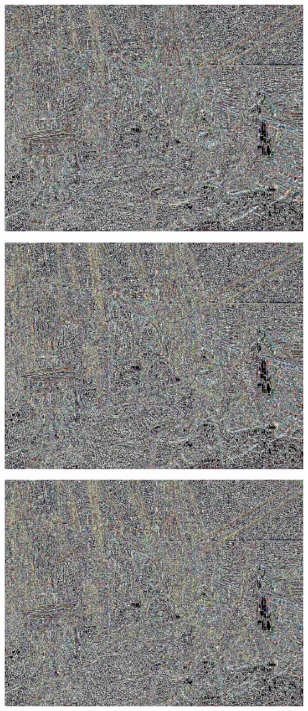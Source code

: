 \documentclass[a4paper,12pt]{article}
\begin{document}
\begin{center}
\includegraphics[width=0.8\linewidth,height=0.7\textheight]{Preconditioning/test_AVERAGE6}
\end{center}\begin{center}

\includegraphics[width=0.8\linewidth,height=0.7\textheight]{Preconditioning/test_AVERAGE7}
\end{center}

\begin{center}
\includegraphics[width=0.8\linewidth,height=0.7\textheight]{Preconditioning/test_AVERAGE8}
\end{center}
\end{document}
